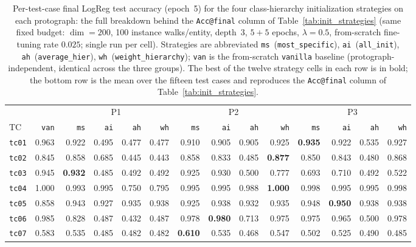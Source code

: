 \begin{table}[p]
\centering
\footnotesize
\setlength{\tabcolsep}{3pt}
\caption{Per-test-case final LogReg test accuracy (epoch~5) for the four class-hierarchy initialization strategies on each protograph: the full breakdown behind the \texttt{Acc@final} column of Table~\ref{tab:init_strategies} (same fixed budget: $\dim=200$, 100 instance walks/entity, depth~3, $5{+}5$ epochs, $\lambda=0.5$, from-scratch fine-tuning rate $0.025$; single run per cell). Strategies are abbreviated \texttt{ms}~(\texttt{most\_specific}), \texttt{ai}~(\texttt{all\_init}), \texttt{ah}~(\texttt{average\_hier}), \texttt{wh}~(\texttt{weight\_hierarchy}); \texttt{van} is the from-scratch \texttt{vanilla} baseline (protograph-independent, identical across the three groups). The best of the twelve strategy cells in each row is in bold; the bottom row is the mean over the fifteen test cases and reproduces the \texttt{Acc@final} column of Table~\ref{tab:init_strategies}.}
\label{tab:init_strategies_pertc}
\begin{tabular}{l r *{4}{r} *{4}{r} *{4}{r}}
\toprule
 & & \multicolumn{4}{c}{P1} & \multicolumn{4}{c}{P2} & \multicolumn{4}{c}{P3} \\
\cmidrule(lr){3-6}\cmidrule(lr){7-10}\cmidrule(lr){11-14}
TC & \texttt{van} & \texttt{ms} & \texttt{ai} & \texttt{ah} & \texttt{wh} & \texttt{ms} & \texttt{ai} & \texttt{ah} & \texttt{wh} & \texttt{ms} & \texttt{ai} & \texttt{ah} & \texttt{wh} \\
\midrule
\texttt{tc01} & 0.963 & 0.922 & 0.495 & 0.477 & 0.477 & 0.910 & 0.905 & 0.905 & 0.925 & \textbf{0.935} & 0.922 & 0.535 & 0.927 \\
\texttt{tc02} & 0.845 & 0.858 & 0.685 & 0.445 & 0.443 & 0.858 & 0.833 & 0.485 & \textbf{0.877} & 0.850 & 0.843 & 0.480 & 0.868 \\
\texttt{tc03} & 0.945 & \textbf{0.932} & 0.485 & 0.492 & 0.492 & 0.925 & 0.930 & 0.500 & 0.777 & 0.693 & 0.710 & 0.492 & 0.522 \\
\texttt{tc04} & 1.000 & 0.993 & 0.995 & 0.750 & 0.795 & 0.995 & 0.995 & 0.988 & \textbf{1.000} & 0.998 & 0.995 & 0.995 & 0.998 \\
\texttt{tc05} & 0.858 & 0.943 & 0.927 & 0.935 & 0.938 & 0.925 & 0.938 & 0.932 & 0.935 & 0.948 & \textbf{0.950} & 0.938 & 0.938 \\
\texttt{tc06} & 0.985 & 0.828 & 0.487 & 0.432 & 0.487 & 0.978 & \textbf{0.980} & 0.713 & 0.975 & 0.975 & 0.965 & 0.500 & 0.978 \\
\texttt{tc07} & 0.583 & 0.535 & 0.485 & 0.482 & 0.482 & \textbf{0.610} & 0.535 & 0.468 & 0.547 & 0.502 & 0.525 & 0.490 & 0.485 \\

\end{tabular}
\end{table}
